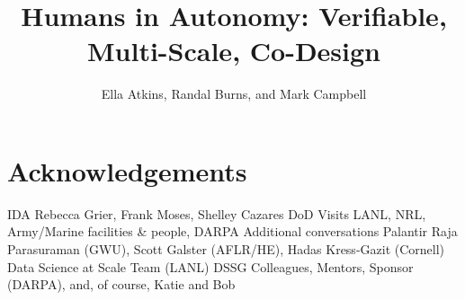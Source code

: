 \documentclass[11pt]{dssg}
\begin{document}
\title{Humans in Autonomy: Verifiable, Multi-Scale, Co-Design}

\author{Ella Atkins, Randal Burns, and Mark Campbell}


\maketitle














%







\section*{Acknowledgements}
IDA
Rebecca Grier, Frank Moses, Shelley Cazares
DoD Visits
LANL, NRL, Army/Marine facilities \& people, DARPA
Additional conversations
Palantir
Raja Parasuraman (GWU), Scott Galster (AFLR/HE), Hadas Kress-Gazit (Cornell)
Data Science at Scale Team (LANL)
DSSG Colleagues, Mentors, Sponsor (DARPA), and, of course, Katie and Bob




\newpage


\normalsize
\end{document}
